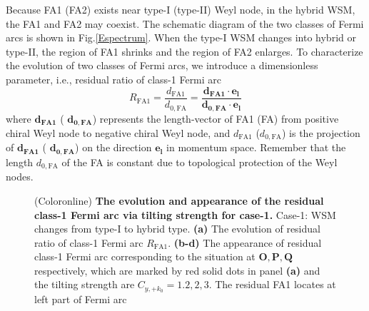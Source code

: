 \documentclass[twocolumn,superscriptaddress]{revtex4}%
\begin{document}
Because FA1 (FA2) exists near type-I (type-II) Weyl node, in the hybrid WSM,
the FA1 and FA2 may coexist. The schematic diagram of the two classes of Fermi
arcs is shown in Fig.\ref{Espectrum}. When the type-I WSM changes into hybrid
or type-II, the region of FA1 shrinks and the region of FA2 enlarges. To
characterize the evolution of two classes of Fermi arcs, we introduce a
dimensionless parameter, i.e., residual ratio of class-1 Fermi arc
\[
R_{\mathrm{FA1}}=\frac{d_{\mathrm{FA1}}}{d_{\mathrm{0,FA}}}=\frac
{\mathbf{d}_{\mathrm{\mathbf{FA1}}}\cdot \mathbf{e}_{\mathbf{l}}}%
{\mathbf{d}_{\mathrm{\mathbf{0,FA}}}\cdot \mathbf{e}_{\mathbf{l}}}%
\]
where $\mathbf{d}_{\mathrm{\mathbf{FA1}}}$ ( $\mathbf{d}%
_{\mathrm{\mathbf{0,FA}}}$) represents the length-vector of FA1 (FA) from
positive chiral Weyl node to negative chiral Weyl node, and $d_{\mathrm{FA1}}$
($d_{\mathrm{0,FA}}$) is the projection of $\mathbf{d}_{\mathrm{\mathbf{FA1}}%
}$ ( $\mathbf{d}_{\mathrm{\mathbf{0,FA}}}$) on the direction $\mathbf{e}%
_{\mathbf{l}}$ in momentum space. Remember that the length $d_{\mathrm{0,FA}}$
of the FA is constant due to topological protection of the Weyl nodes.
\begin{figure}[t]
\caption{(Coloronline) \textbf{The evolution and appearance of the residual class-1 Fermi arc via tilting strength for case-1.} Case-1: WSM changes from type-I to hybrid type. \textbf{(a)} The evolution of residual ratio of class-1 Fermi arc $R_{\mathrm{FA1}}$. \textbf{(b-d)} The appearance of residual class-1 Fermi arc corresponding to the situation at $\textbf{O},\textbf{P},\textbf{Q}$ respectively, which are marked by red solid dots in panel \textbf{(a)} and the tilting strength are $C_{y,+k_{0}}=1.2,2,3$. The residual FA1 locates at left part of Fermi arc}%
\label{FA1}%
\end{figure}
\end{document}
